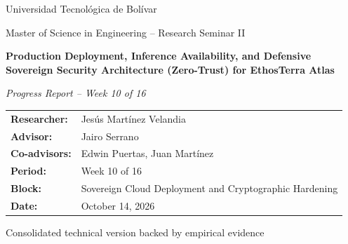 \documentclass[11pt,a4paper]{article}
\begin{document}
\begin{titlepage}
    \thispagestyle{empty}
    \centering
    \vspace*{1.5cm}

    {\large Universidad Tecnol\'ogica de Bol\'ivar\par}
    \vspace{0.3cm}
    {\normalsize Master of Science in Engineering -- Research Seminar II\par}

    \vspace{2.0cm}
    {\LARGE\bfseries Production Deployment, Inference Availability, and Defensive Sovereign Security Architecture (Zero-Trust) for EthosTerra Atlas\par}

    \vspace{0.8cm}
    {\large\itshape Progress Report -- Week 10 of 16\par}

    \vspace{2.2cm}
    \begin{tabular}{ll}
        \textbf{Researcher:} & Jes\'us Mart\'inez Velandia \\
        \textbf{Advisor:} & Jairo Serrano \\
        \textbf{Co-advisors:} & Edwin Puertas, Juan Mart\'inez \\
        \textbf{Period:} & Week 10 of 16 \\
        \textbf{Block:} & Sovereign Cloud Deployment and Cryptographic Hardening \\
        \textbf{Date:} & October 14, 2026 \\
    \end{tabular}

    \vfill
    {\small Consolidated technical version backed by empirical evidence\par}
    \vspace*{1.0cm}
\end{titlepage}

\newpage
{}
\fancyfoot[C]{\small \thepage}
\tableofcontents
\newpage

\setcounter{page}{1}
\end{document}
